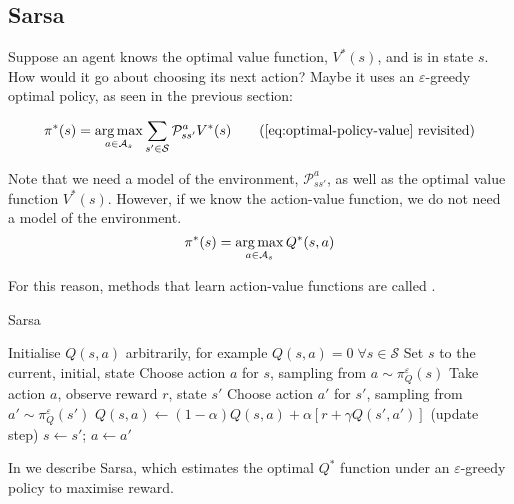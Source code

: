 \citep[Section~2.2]{sutton1998introduction}

\subsection{Sarsa\label{subsec:sarsa}}

Suppose an agent knows the optimal value function, $V^*(s)$, and is in state $s$.
How would it go about choosing its next action? Maybe it uses an
$\varepsilon$-greedy optimal policy, as seen in the previous section:

\begin{equation}
  \pi^*(s) = \argmax_{a\in\mathcal{A}_s} \sum_{s'\in\mathcal{S}}\mathcal{P}^a_{ss'}V^*(s)
  \tag{\ref{eq:optimal-policy-value} revisited}
\end{equation}

Note that we need a model of the environment, $\mathcal{P}^a_{ss'}$, as well as
the optimal value function $V^*(s)$. However, if we know the action-value
function, we do not need a model of the environment.
\begin{equation}
  \pi^*(s) = \argmax_{a\in\mathcal{A}_s} Q^*(s, a)
  \label{eq:q-policy}
\end{equation}

For this reason, methods that learn action-value functions are called
 \citep[Subsection~21.3.2]{russell2009aima}.

\begin{algorithm}[h]
\caption{Sarsa \citep[Section~6.4]{sutton1998introduction}}
\label{alg:sarsa}
\begin{algorithmic}
\State Initialise $Q(s, a)$ arbitrarily, for example $Q(s, a)=0 \; \forall
s\in\mathcal{S}$
  \State Set $s$ to the current, initial, state
  \State Choose action $a$ for $s$, sampling from $a \sim \pi^\varepsilon_Q(s)$
    \State Take action $a$, observe reward $r$, state $s'$
    \State Choose action $a'$ for $s'$, sampling from $a' \sim \pi^\varepsilon_Q(s')$
    \State $Q(s, a) \gets (1-\alpha)Q(s,a) +
      \alpha \left[r + \gamma Q(s', a') \right]$ (update step)
    \State $s \gets s'$; $a \gets a'$
\EndRepeatComment
\end{algorithmic}
\end{algorithm}

In  we describe Sarsa, which estimates the
optimal $Q^*$ function under an $\varepsilon$-greedy policy to maximise reward.

